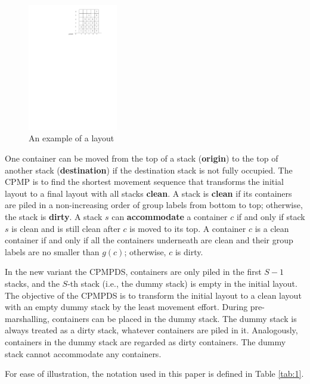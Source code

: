 \documentclass[review,3p,times,authoryear,12pt]{elsarticle}
\begin{document}
\begin{figure}[!htb]
\centering
\includegraphics[width=0.35\textwidth]{fig3.pdf}
\caption{An example of a layout}
\label{fig3}
\end{figure}

One container can be moved from the top of a stack (\textbf{origin}) to the top of another stack (\textbf{destination}) if the destination stack is not fully occupied.
The CPMP is to find the shortest movement sequence that transforms the initial layout to a final layout with all stacks \textbf{clean}.
A stack is \textbf{clean} if its containers are piled in a non-increasing order of group labels from bottom to top; otherwise, the stack is \textbf{dirty}.
A stack $s$ can \textbf{accommodate} a container $c$ if and only if stack $s$ is clean and is still clean after $c$ is moved to its top.
A container $c$ is a clean container if and only if all the containers underneath are clean and their group labels are no smaller than $g(c)$; otherwise, $c$ is dirty.


In the new variant the CPMPDS, containers are only piled in the first $S-1$ stacks, and the $S$-th stack (i.e., the dummy stack) is empty in the initial layout.
The objective of the CPMPDS is to transform the initial layout to a clean layout with an empty dummy stack by the least movement effort.
During pre-marshalling, containers can be placed in the dummy stack.
The dummy stack is always treated as a dirty stack, whatever containers are piled in it.
Analogously, containers in the dummy stack are regarded as dirty containers.
The dummy stack cannot accommodate any containers.

For ease of illustration, the notation used in this paper is defined in Table \ref{tab:1}.
\end{document}
